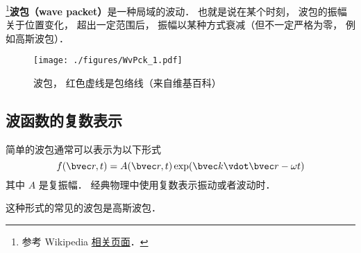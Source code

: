 

\footnote{参考 Wikipedia \href{https://en.wikipedia.org/wiki/Wave_packet}{相关页面}．}\textbf{波包（wave packet）}是一种局域的波动． 也就是说在某个时刻， 波包的振幅关于位置变化， 超出一定范围后， 振幅以某种方式衰减（但不一定严格为零， 例如高斯波包）． %

\begin{figure}[ht]
\centering
\texttt{[image: ./figures/WvPck\_1.pdf]}
\caption{波包， 红色虚线是包络线（来自维基百科）} \label{WvPck_fig1}
\end{figure}

\subsection{波函数的复数表示}
简单的波包通常可以表示为以下形式
\begin{equation}
f(\bvec r, t) = A(\bvec r, t) \exp(\bvec k \vdot \bvec r - \omega t)
\end{equation}
其中 $A$ 是复振幅． 经典物理中使用复数表示振动或者波动时．

这种形式的常见的波包是高斯波包．
